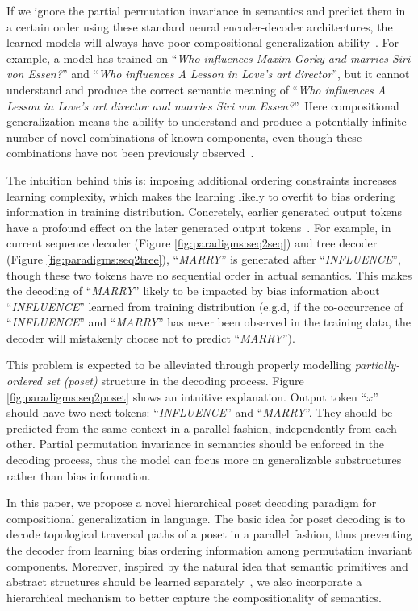 \documentclass{article}
\begin{document}
If we ignore the partial permutation invariance in semantics and predict them in a certain order using these standard neural encoder-decoder architectures, the learned models will always have poor compositional generalization ability~\citep{keysers2020measuring}.
For example, a model has trained on ``\emph{Who influences Maxim Gorky and marries Siri von Essen?}'' and ``\emph{Who influences A Lesson in Love's art director}'', but it cannot understand and produce the correct semantic meaning of ``\emph{Who influences A Lesson in Love's art director and marries Siri von Essen?}''.
Here compositional generalization means the ability to understand and produce a potentially infinite number of novel combinations of known components, even though these combinations have not been previously observed~\citep{chomsky1965aspects}.

The intuition behind this is: imposing additional ordering constraints increases learning complexity, which makes the learning likely to overfit to bias ordering information in training distribution.
Concretely, earlier generated output tokens have a profound effect on the later generated output tokens~\citep{mehri2018middle,wu2018beyond}.
For example, in current sequence decoder (Figure \ref{fig:paradigms:seq2seq}) and tree decoder (Figure \ref{fig:paradigms:seq2tree}), ``\emph{MARRY}'' is generated after ``\emph{INFLUENCE}'', though these two tokens have no sequential order in actual semantics.
This makes the decoding of ``\emph{MARRY}'' likely to be impacted by bias information about ``\emph{INFLUENCE}'' learned from training distribution (e.g.d, if the co-occurrence of ``\emph{INFLUENCE}'' and ``\emph{MARRY}'' has never been observed in the training data, the decoder will mistakenly choose not to predict ``\emph{MARRY}'').

This problem is expected to be alleviated through properly modelling \emph{partially-ordered set (poset)} structure in the decoding process.
Figure \ref{fig:paradigms:seq2poset} shows an intuitive explanation.
Output token ``$x$'' should have two next tokens: ``\emph{INFLUENCE}'' and ``\emph{MARRY}''.
They should be predicted from the same context in a parallel fashion, independently from each other.
Partial permutation invariance in semantics should be enforced in the decoding process, thus the model can focus more on generalizable substructures rather than bias information.


In this paper, we propose a novel hierarchical poset decoding paradigm for compositional generalization in language.
The basic idea for poset decoding is to decode topological traversal paths of a poset in a parallel fashion, thus preventing the decoder from learning bias ordering information among permutation invariant components. Moreover, inspired by the natural idea that semantic primitives and abstract structures should be learned separately~\citep{russin2019compositional, li2019compositional, lake2019compositional, gordon2020permutation}, we also incorporate a hierarchical mechanism to better capture the compositionality of semantics.
\end{document}
